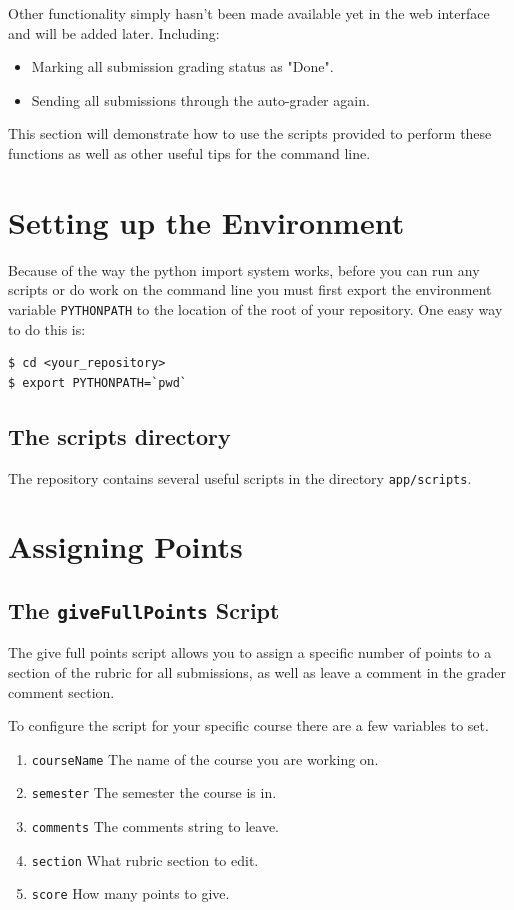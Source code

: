 \documentclass[11pt]{report}
\begin{document}
Other functionality simply hasn't been made available yet
in the web interface and will be added later. Including:
\begin{itemize}
  \item Marking all submission grading status as "Done".
  \item Sending all submissions through the auto-grader again.
\end{itemize}

This section will demonstrate how to use the scripts provided to perform these
functions as well as other useful tips for the command line.

\section{Setting up the Environment}
Because of the way the python import system works, before you can run any
scripts or do work on the command line you must first export the environment
variable \texttt{PYTHONPATH} to the location of the root of your repository.
One easy way to do this is:
\begin{verbatim}
$ cd <your_repository>
$ export PYTHONPATH=`pwd`
\end{verbatim}

\subsection{The scripts directory}
The repository contains several useful scripts in the directory
\texttt{app/scripts}.

\section{Assigning Points}
\label{sec:assigning_points}
\subsection{The \texttt{giveFullPoints} Script}
The give full points script allows you to assign a specific number of points to a
section of the rubric for all submissions, as well as leave a comment in the grader 
comment section. 

To configure the script for your specific course there are a few variables to set.

\begin{enumerate}
\item \texttt{courseName} The name of the course you are working on.
\item \texttt{semester} The semester the course is in.
\item \texttt{comments} The comments string to leave.
\item \texttt{section} What rubric section to edit.
\item \texttt{score} How many points to give.
\end{enumerate}
\end{document}
